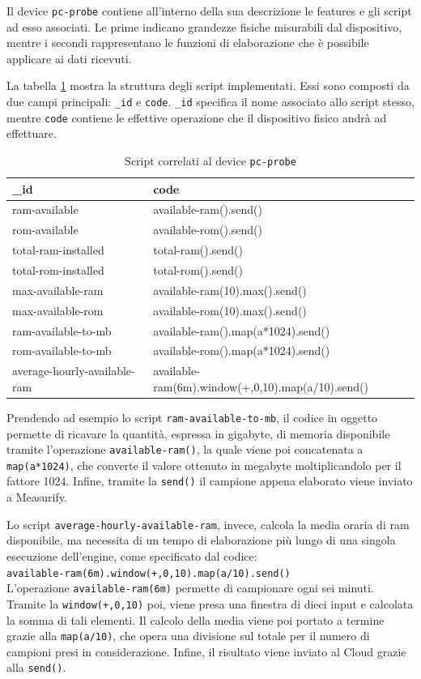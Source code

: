 Il device \texttt{pc-probe} contiene all'interno della sua descrizione le features e gli script ad esso associati. Le prime indicano grandezze fisiche misurabili dal dispositivo, mentre i secondi rappresentano le funzioni di elaborazione che è possibile applicare ai dati ricevuti. 

La tabella \ref{script} mostra la struttura degli script implementati. Essi sono composti da due campi principali: \texttt{\_id} e \texttt{code}.  \texttt{\_id} specifica il nome associato allo script stesso, mentre \texttt{code} contiene le effettive operazione che il dispositivo fisico andrà ad effettuare. 

\begin{table}[H]
	\begin{tabular}{|p{}|p{}|}
		\hline
		\textbf{\_id} & \textbf{code} \\
		\hline
		ram-available & available-ram().send()\\
		\hline
		rom-available & available-rom().send()\\
		\hline
		total-ram-installed & total-ram().send()\\
		\hline
		total-rom-installed & total-rom().send()\\
		\hline
		max-available-ram & available-ram(10).max().send()\\	
		\hline
		max-available-rom & available-rom(10).max().send()\\
		\hline	
		ram-available-to-mb & available-ram().map(a*1024).send()\\
		\hline
		rom-available-to-mb & available-rom().map(a*1024).send()\\
		\hline
		average-hourly-available-ram & available-ram(6m).window(+,0,10).map(a/10).send()\\
		\hline
	\end{tabular}
	\caption{Script correlati al device \texttt{pc-probe}}
	\label{script}
\end{table}

Prendendo ad esempio lo script \texttt{ram-available-to-mb}, il codice in oggetto permette di ricavare la quantità, espressa in gigabyte, di memoria disponibile tramite l’operazione \texttt{available-ram()}, la quale viene poi concatenata a \texttt{map(a*1024)}, che converte il valore ottenuto in megabyte moltiplicandolo per il fattore 1024. Infine, tramite la \texttt{send()} il campione appena elaborato viene inviato a Measurify.

Lo script \texttt{average-hourly-available-ram}, invece, calcola la media oraria di ram disponibile, ma necessita di un tempo di elaborazione più lungo di una singola esecuzione dell'engine, come specificato dal codice:\\ \texttt{available-ram(6m).window(+,0,10).map(a/10).send()}\\ L’operazione \texttt{available-ram(6m)} permette di campionare ogni sei minuti. Tramite la \texttt{window(+,0,10)} poi, viene presa una finestra di dieci input e calcolata la somma di tali elementi. Il calcolo della media viene poi portato a termine grazie alla \texttt{map(a/10)}, che opera una divisione sul totale per il numero di campioni presi in considerazione. Infine, il risultato viene inviato al Cloud grazie alla \texttt{send()}.

